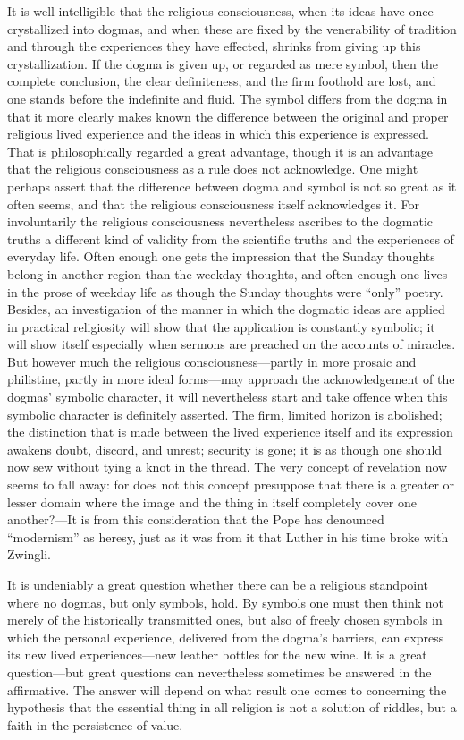 \documentclass[12pt,a4paper]{book}
\newcommand{\opage}[1]{\marginnote{\footnotesize\textit{[#1]}}}
\begin{document}
It is well intelligible that the religious consciousness, when its ideas have once crystallized into
dogmas, and when these are fixed by the venerability of tradition and through the experiences they have
effected, shrinks from giving up this crystallization. If the dogma is given up, or regarded as mere
symbol, then the complete conclusion, the clear 
\opage{138}definiteness, and the firm foothold are lost, and one
stands before the indefinite and fluid. The symbol differs from the dogma in that it more clearly makes
known the difference between the original and proper religious lived experience and the ideas in which
this experience is expressed. That is philosophically regarded a great advantage, though it is an
advantage that the religious consciousness as a rule does not acknowledge. One might perhaps assert that
the difference between dogma and symbol is not so great as it often seems, and that the religious
consciousness itself acknowledges it. For involuntarily the religious consciousness nevertheless ascribes
to the dogmatic truths a different kind of validity from the scientific truths and the experiences of
everyday life. Often enough one gets the impression that the Sunday thoughts belong in another region
than the weekday thoughts, and often enough one lives in the prose of weekday life as though the Sunday
thoughts were ``only'' poetry. Besides, an investigation of the manner in which the dogmatic ideas are
applied in practical religiosity will show that the application is constantly symbolic; it will show
itself especially when sermons are preached on the accounts of miracles. But however much the religious
consciousness---partly in more prosaic and philistine, partly in more ideal forms---may approach the
acknowledgement of the dogmas' symbolic character, it will nevertheless start and take offence when this
symbolic character is definitely asserted. The firm, limited horizon is abolished; the distinction that
is made between the lived experience itself and its expression awakens doubt, discord, and unrest;
security is gone; it is as though one should now sew without tying a knot in the thread. The very concept
of revelation now seems to fall away: for does not this concept presuppose that there is a greater or
lesser domain where the image and the thing in itself completely cover one another?---It is from this
consideration that the Pope has denounced ``modernism'' as heresy, just as it was from it that Luther in
his time broke with Zwingli.

It is undeniably a great question whether there can be a religious standpoint where no dogmas, but only
symbols, hold. By symbols one must then think not merely of the historically transmitted ones, but also
of freely chosen symbols in which the personal experience, delivered from the dogma's barriers, can
express its new lived experiences---new leather bottles for the new wine. It is a great question---but
great questions can nevertheless sometimes be answered in the affirmative. The answer will depend on what
result one comes to concerning the hypothesis that the essential thing in all religion is not a solution
of riddles, but a faith in the persistence of value.---
\end{document}
